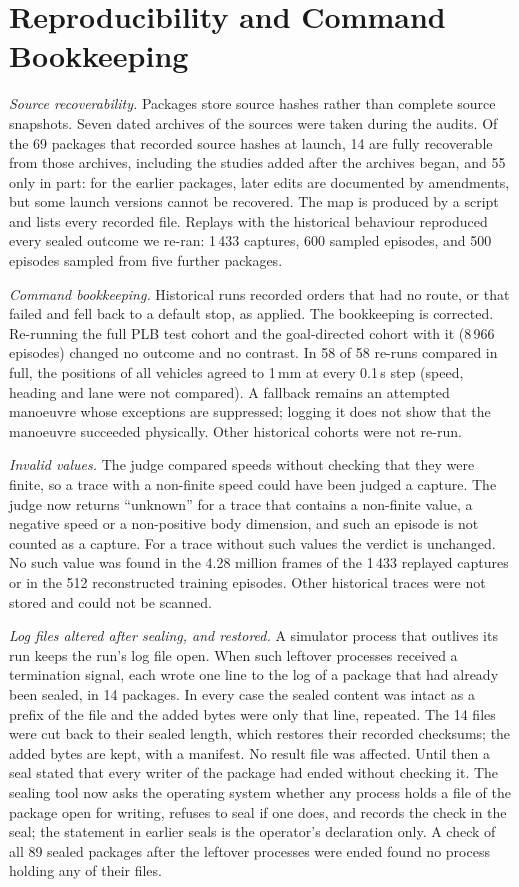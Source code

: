 \documentclass[preprint,12pt]{elsarticle}
\begin{document}
\section{Reproducibility and Command Bookkeeping}\label{sec:s-repro}

\emph{Source recoverability.} Packages store source hashes rather than complete source snapshots. Seven dated
archives of the sources were taken during the audits. Of the 69 packages that recorded source hashes at launch, 14
are fully recoverable from those archives, including the studies added after the archives began, and 55 only in
part: for the earlier packages, later edits are documented by amendments, but some launch versions cannot be
recovered. The map is produced by a script and lists every recorded file. Replays with the historical behaviour reproduced every sealed outcome
we re-ran: 1\,433 captures, 600 sampled episodes, and 500 episodes sampled from five further packages.

\emph{Command bookkeeping.} Historical runs recorded orders that had no route, or that failed and fell back to a
default stop, as applied. The bookkeeping is corrected. Re-running the full PLB test cohort and the goal-directed
cohort with it (8\,966 episodes) changed no outcome and no contrast. In 58 of 58 re-runs compared in full, the
positions of all vehicles agreed to 1\,mm at every 0.1\,s step (speed, heading and lane were not compared). A
fallback remains an attempted manoeuvre whose exceptions are suppressed; logging it does not show that the manoeuvre
succeeded physically. Other historical cohorts were not re-run.

\emph{Invalid values.} The judge compared speeds without checking that they were finite, so a trace with a
non-finite speed could have been judged a capture. The judge now returns ``unknown'' for a trace that contains a
non-finite value, a negative speed or a non-positive body dimension, and such an episode is not counted as a
capture. For a trace without such values the verdict is unchanged. No such value was found in the 4.28 million
frames of the 1\,433 replayed captures or in the 512 reconstructed training episodes. Other historical traces were
not stored and could not be scanned.

\emph{Log files altered after sealing, and restored.} A simulator process that outlives its run keeps the run's log
file open. When such leftover processes received a termination signal, each wrote one line to the log of a package
that had already been sealed, in 14 packages. In every case the sealed content was intact as a prefix of the file
and the added bytes were only that line, repeated. The 14 files were cut back to their sealed length, which
restores their recorded checksums; the added bytes are kept, with a manifest. No result file was affected. Until
then a seal stated that every writer of the package had ended without checking it. The sealing tool now asks the
operating system whether any process holds a file of the package open for writing, refuses to seal if one does, and
records the check in the seal; the statement in earlier seals is the operator's declaration only. A check of all 89
sealed packages after the leftover processes were ended found no process holding any of their files.
\end{document}
